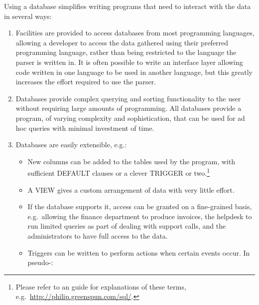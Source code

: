 Using a database simplifies writing programs that need to interact with the
data in several ways:

\begin{enumerate}

    \item Facilities are provided to access databases from most programming
        languages, allowing a developer to access the data gathered using
        their preferred programming language, rather than being restricted
        to the language the parser is written in.  It is often possible to
        write an interface layer allowing code written in one language to
        be used in another language, but this greatly increases the effort
        required to use the parser.

    \item Databases provide complex querying and sorting functionality to
        the user without requiring large amounts of programming.  All
        databases provide a program, of varying complexity and
        sophistication, that can be used for ad hoc queries with minimal
        investment of time.

    \item Databases are easily extensible, e.g.:

        \begin{itemize}

            \item New columns can be added to the tables used by the
                program, with sufficient DEFAULT clauses or a clever
                TRIGGER or two.\footnote{Please refer to an \SQL{} guide
                for explanations of these terms, e.g.\
                \url{http://philip.greenspun.com/sql/}.}

            \item A VIEW gives a custom arrangement of data with very
                little effort.

            \item If the database supports it, access can be granted on a
                fine-grained basis, e.g.\ allowing the finance department
                to produce invoices, the helpdesk to run limited queries as
                part of dealing with support calls, and the administrators
                to have full access to the data.

            \item Triggers can be written to perform actions when certain
                events occur.  In pseudo-\SQL{}\@:


\end{itemize}
\end{enumerate}
